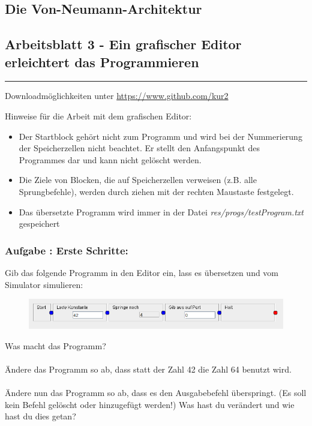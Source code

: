 \documentclass[a4paper,12pt]{article}
\newcounter{aufgnr}
\begin{document}
\begin{center}
\section*{Die Von-Neumann-Architektur}
\subsection*{Arbeitsblatt 3 - Ein grafischer Editor erleichtert das Programmieren}
\end{center}

\hrule
\vspace{.5cm}

Downloadmöglichkeiten unter \url{https://www.github.com/kur2}

\vspace{1cm}

Hinweise für die Arbeit mit dem grafischen Editor:
\begin{itemize}
\item Der Startblock gehört nicht zum Programm und wird bei der Nummerierung der Speicherzellen nicht beachtet. Er stellt den Anfangspunkt des Programmes dar und kann nicht gelöscht werden.
\item Die Ziele von Blocken, die auf Speicherzellen verweisen (z.B. alle Sprungbefehle), werden durch ziehen mit der rechten Maustaste festgelegt.
\item Das übersetzte Programm wird immer in der Datei \textit{res/progs/testProgram.txt} gespeichert
\end{itemize}


\subsubsection*{Aufgabe \theaufgnr: Erste Schritte:}
Gib das folgende Programm in den Editor ein, lass es übersetzen und vom Simulator simulieren:
\begin{figure}[h]
\centering
\includegraphics[scale=.65]{FirstJump.png}
\end{figure}
Was macht das Programm?\\
\\
Ändere das Programm so ab, dass statt der Zahl 42 die Zahl 64 benutzt wird.\\
\\
Ändere nun das Programm so ab, dass es den Ausgabebefehl überspringt. (Es soll kein Befehl gelöscht oder hinzugefügt werden!) Was hast du verändert und wie hast du dies getan?\\
\\
\\
\\
\end{document}
